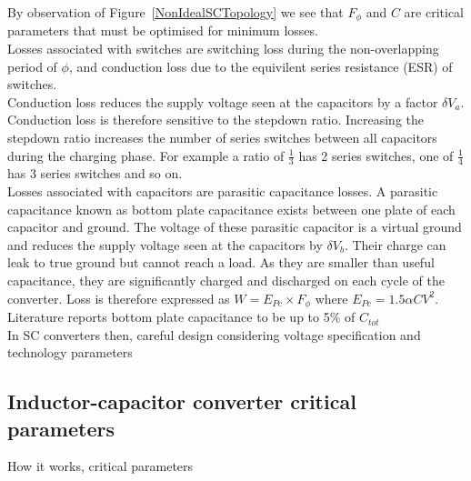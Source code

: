\documentclass[letterpaper,twocolumn,10pt]{article}
\begin{document}
By observation of Figure~\ref{NonIdealSCTopology} we see that $F_\phi$ and $C$ are critical parameters that must be optimised for minimum losses.\\
Losses associated with switches are switching loss during the non-overlapping period of $\phi$, and conduction loss due to the equivilent series resistance (ESR) of switches.\\
Conduction loss reduces the supply voltage seen at the capacitors by a factor $\delta V_a$. Conduction loss is therefore sensitive to the stepdown ratio. Increasing the stepdown ratio increases the number of series switches between all capacitors during the charging phase. For example a ratio of $\frac{1}{3}$ has 2 series switches, one of $\frac{1}{4}$ has 3 series switches and so on.\\
Losses associated with capacitors are parasitic capacitance losses. A parasitic capacitance known as bottom plate capacitance exists between one plate of each capacitor and ground. The voltage of these parasitic capacitor is a virtual ground and reduces the supply voltage seen at the capacitors by $\delta V_b$. Their charge can leak to true ground but cannot reach a load. As they are smaller than useful capacitance, they are significantly charged and discharged on each cycle of the converter. Loss is therefore expressed as $W = E_{Pc} \times F_\phi$ where $E_{Pc} = 1.5\alpha CV^2$. Literature reports bottom plate capacitance to be up to 5\% of $C_{tot}$~\cite{Ramadass2007}\\
In SC converters then, careful design considering voltage specification and technology parameters 

\subsection{Inductor-capacitor converter critical parameters}

How it works, critical parameters
\end{document}
